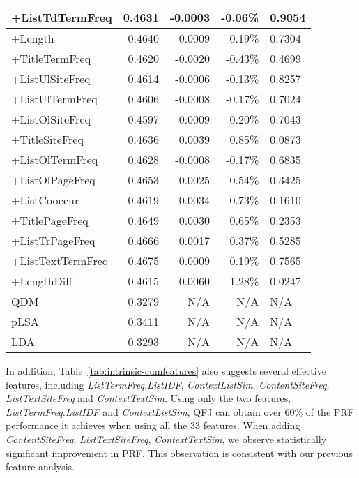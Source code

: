 \begin{table}[H]
\begin{tabular}{|l|r|r|r|l|}
+ListTdTermFreq & 0.4631 & -0.0003 & -0.06\% & 0.9054 \\ \hline
+Length & 0.4640 & 0.0009 & 0.19\% & 0.7304 \\ \hline
+TitleTermFreq & 0.4620 & -0.0020 & -0.43\% & 0.4699 \\ \hline
+ListUlSiteFreq & 0.4614 & -0.0006 & -0.13\% & 0.8257 \\ \hline
+ListUlTermFreq & 0.4606 & -0.0008 & -0.17\% & 0.7024 \\ \hline
+ListOlSiteFreq & 0.4597 & -0.0009 & -0.20\% & 0.7043 \\ \hline
+TitleSiteFreq & 0.4636 & 0.0039 & 0.85\% & 0.0873 \\ \hline
+ListOlTermFreq & 0.4628 & -0.0008 & -0.17\% & 0.6835 \\ \hline
+ListOlPageFreq & 0.4653 & 0.0025 & 0.54\% & 0.3425 \\ \hline
+ListCooccur & 0.4619 & -0.0034 & -0.73\% & 0.1610 \\ \hline
+TitlePageFreq & 0.4649 & 0.0030 & 0.65\% & 0.2353 \\ \hline
+ListTrPageFreq & 0.4666 & 0.0017 & 0.37\% & 0.5285 \\ \hline
+ListTextTermFreq & 0.4675 & 0.0009 & 0.19\% & 0.7565 \\ \hline
+LengthDiff & 0.4615 & -0.0060 & -1.28\% & 0.0247 \\ \hhline{=====}
QDM & 0.3279 & N/A & N/A & N/A \\ \hline
pLSA & 0.3411 & N/A & N/A & N/A \\ \hline
LDA & 0.3293 & N/A & N/A & N/A \\ \hline
\end{tabular}
\end{table}

In addition, Table~\ref{tab:intrinsic-cumfeatures} also suggests several effective features, including \textit{ListTermFreq.ListIDF}, \textit{ContextListSim}, \textit{ContentSiteFreq}, \textit{ListTextSiteFreq} and \textit{ContextTextSim}. Using only the two features, \textit{ListTermFreq.ListIDF} and \textit{ContextListSim}, QFJ can obtain over 60\% of the PRF performance it achieves when using all the 33 features. When adding \textit{ContentSiteFreq}, \textit{ListTextSiteFreq}, \textit{ContextTextSim}, we observe statistically significant improvement in PRF. This observation is consistent with our previous feature analysis.


